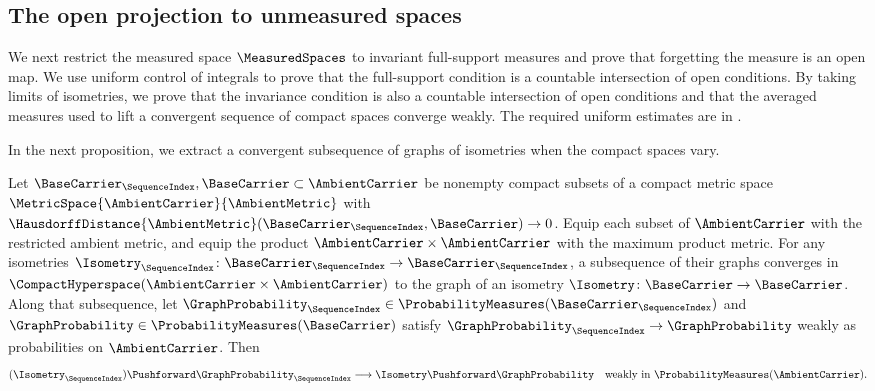 \subsection{The open projection to unmeasured spaces}\label{subsec:measures-open-projection}
We next restrict the measured space
$\MeasuredSpaces$
to invariant full-support measures
and prove that forgetting the measure is an open map.
We use uniform control of integrals to prove that the full-support condition
is a countable intersection of open conditions.
By taking limits of isometries,
we prove that the invariance condition is also
a countable intersection of open conditions and that the averaged measures
used to lift a convergent sequence of compact spaces converge weakly.
The required uniform estimates are in
.

In the next proposition,
we extract a convergent subsequence of graphs of isometries
when the compact spaces vary.

\begin{proposition}\label{lem:isometry-limits}
Let
$\BaseCarrier _\SequenceIndex ,\BaseCarrier \subset \AmbientCarrier $
be nonempty compact subsets of a compact metric space
$\MetricSpace{\AmbientCarrier }{\AmbientMetric }$
with
$\HausdorffDistance{\AmbientMetric }(\BaseCarrier _\SequenceIndex ,\BaseCarrier )\to0$.
Equip each subset of
$\AmbientCarrier$
with the restricted ambient metric, and equip the product
$\AmbientCarrier\times\AmbientCarrier$
with the maximum product metric.
For any isometries
$\Isometry _\SequenceIndex \colon \BaseCarrier _\SequenceIndex \to \BaseCarrier _\SequenceIndex $,
a subsequence of their graphs converges in
$\CompactHyperspace(\AmbientCarrier \times \AmbientCarrier )$
to the graph of an isometry
$\Isometry \colon \BaseCarrier \to \BaseCarrier $.
Along that subsequence,
let
$\GraphProbability_\SequenceIndex\in\ProbabilityMeasures(\BaseCarrier_\SequenceIndex)$
and
$\GraphProbability\in\ProbabilityMeasures(\BaseCarrier)$
satisfy
$\GraphProbability_\SequenceIndex\to\GraphProbability$
weakly as probabilities on
$\AmbientCarrier$.
Then
\[
 (\Isometry_\SequenceIndex)\Pushforward\GraphProbability_\SequenceIndex
 \longrightarrow\Isometry\Pushforward\GraphProbability
 \quad\text{weakly in }\ProbabilityMeasures(\AmbientCarrier).
\]
\end{proposition}

